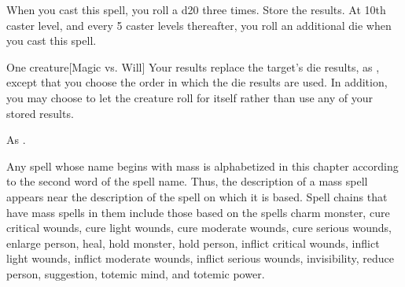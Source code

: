 \begin{spellheader}
    \spellrng{\rngmed}
    \spellspecial When you cast this spell, you roll a d20 three times. Store the results. At 10th caster level, and every 5 caster levels thereafter, you roll an additional die when you cast this spell.
\end{spellheader}
\begin{spelleffects}
    \begin{spelltarget}{One creature}[Magic vs. Will]
        \spellsuccess Your results replace the target's die results, as , except that you choose the order in which the die results are used. In addition, you may choose to let the creature roll for itself rather than use any of your stored results.
    \end{spelltarget}
\end{spelleffects}
\begin{spellfooter}
    \spellnotes As .

    \par Any spell whose name begins with mass is alphabetized in this chapter according to the second word of the spell name. Thus, the description of a mass spell appears near the description of the spell on which it is based. Spell chains that have mass spells in them include those based on the spells charm monster, cure critical wounds, cure light wounds, cure moderate wounds, cure serious wounds, enlarge person, heal, hold monster, hold person, inflict critical wounds, inflict light wounds, inflict moderate wounds, inflict serious wounds, invisibility, reduce person, suggestion, totemic mind, and totemic power.
\end{spellfooter}

